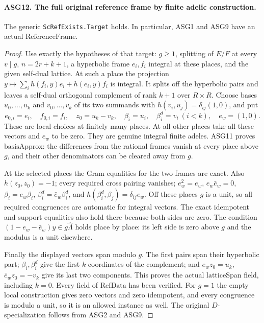 \paragraph{ASG12. The full original reference frame by finite adelic construction.}
\label{claim:ASG12}
The generic \texttt{ScRefExists.Target} holds.  In particular,
ASG1 and ASG9 have an actual \(\mathrm{ReferenceFrame}\).
\begin{proof}
Use exactly the hypotheses of that target: \(g\ge1\), splitting
of \(E/F\) at every \(v\mid g\), \(n=2r+k+1\), a
hyperbolic frame \(e_i,f_i\) integral at these places, and the
given self-dual lattice.  At such a place the projection
\(y\mapsto\sum_i h(f_i,y)e_i+h(e_i,y)f_i\) is integral.
It splits off the hyperbolic pairs and leaves a self-dual orthogonal
complement of rank \(k+1\) over \(R\times R\).
Choose bases \(u_0,\ldots,u_k\) and \(v_0,\ldots,v_k\)
of its two summands with
\(h(v_i,u_j)=\delta_{ij}(1,0)\), and put
\[
 e_{0,i}=e_i,\quad f_{0,i}=f_i,\quad z_0=u_k-v_k,
 \quad \beta_i=u_i,\quad\beta_i^d=v_i\ (i<k),
 \quad e_w=(1,0).
\tag{ASG.11}
\]
These are local choices at finitely many places.  At all other places
take all these vectors and \(e_w\) to be zero.  They are genuine
integral finite adeles.  ASG11 proves \(\mathrm{basisApprox}\):
the differences from the rational frames vanish at every place above
\(g\), and their other denominators can be cleared away from \(g\).

At the selected places the Gram equalities for the two frames are
exact.  Also \(h(z_0,z_0)=-1\); every required cross pairing
vanishes; \(e_w^2=e_w\), \(e_w\bar e_w=0\),
\(\beta_i=e_w\beta_i\),
\(\beta_i^d=\bar e_w\beta_i^d\), and
\(h(\beta_i^d,\beta_j)=\delta_{ij}e_w\).
Off these places \(g\) is a unit, so all required congruences
are automatic for integral vectors.  The exact idempotent and support
equalities also hold there because both sides are zero.
The condition \((1-e_w-\bar e_w)y\in g\widehat\Lambda\)
holds place by place: its left side is zero above \(g\) and
the modulus is a unit elsewhere.

Finally the displayed vectors span modulo \(g\).
The first pairs span their hyperbolic part; \(\beta_i,\beta_i^d\)
give the first \(k\) coordinates of the complement; and
\(e_w z_0=u_k\), \(\bar e_w z_0=-v_k\) give its last two
components.  This proves the actual \(\mathrm{latticeSpan}\)
field, including \(k=0\).  Every field of \(\mathrm{RefData}\)
has been verified.  For \(g=1\) the empty local construction gives
zero vectors and zero idempotent, and every congruence is modulo a unit,
so it is an allowed instance as well.
The original \(D\)-specialization follows from ASG2 and ASG9.
\end{proof}

